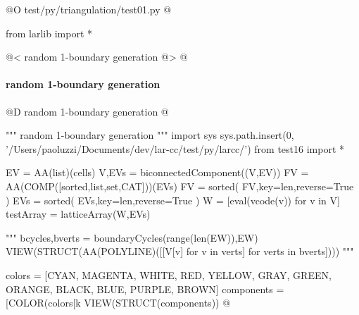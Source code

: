 \documentclass[11pt,oneside]{article}	%
\begin{document}
@O test/py/triangulation/test01.py
@{
from larlib import *

@< random 1-boundary generation @>
@}

\paragraph{random 1-boundary generation}

@D random 1-boundary generation
@{""" random 1-boundary generation """
import sys
sys.path.insert(0, '/Users/paoluzzi/Documents/dev/lar-cc/test/py/larcc/')
from test16 import *

EV = AA(list)(cells)
V,EVs = biconnectedComponent((V,EV))
FV = AA(COMP([sorted,list,set,CAT]))(EVs)
FV = sorted( FV,key=len,reverse=True )
EVs = sorted( EVs,key=len,reverse=True )
W = [eval(vcode(v)) for v in V]
testArray = latticeArray(W,EVs)

"""
bcycles,bverts = boundaryCycles(range(len(EW)),EW)
VIEW(STRUCT(AA(POLYLINE)([[V[v] for v in verts] for verts in bverts])))
"""
    
colors = [CYAN, MAGENTA, WHITE, RED, YELLOW, GRAY, GREEN, ORANGE, BLACK, BLUE, 
			PURPLE, BROWN]
components = [COLOR(colors[k%
VIEW(STRUCT(components))
@}








\end{document}

